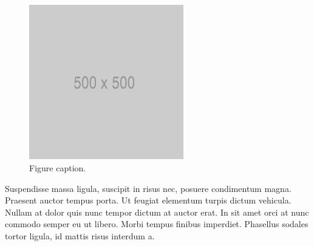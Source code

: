 \documentclass[a4paper,spanish,12pt]{report}
\begin{document}
\begin{figure}[H]
  \vspace{1\baselineskip}
  \begin{center}
    \includegraphics[width=0.6\textwidth]{example.png}
    \caption{Figure caption.}
  \end{center}
\end{figure}

Suspendisse massa ligula, suscipit in risus nec, posuere condimentum magna. Praesent auctor tempus porta. Ut feugiat elementum turpis dictum vehicula. Nullam at dolor quis nunc tempor dictum at auctor erat. In sit amet orci at nunc commodo semper eu ut libero. Morbi tempus finibus imperdiet. Phasellus sodales tortor ligula, id mattis risus interdum a.


\end{document}
